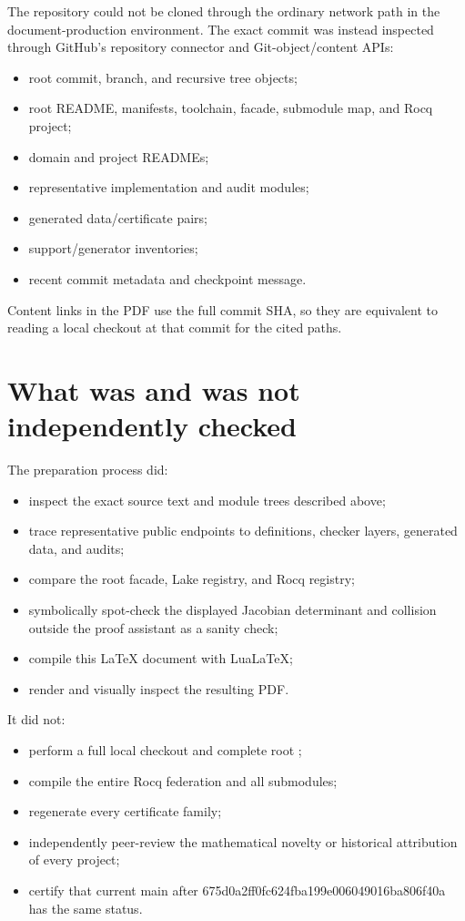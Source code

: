 \documentclass[
  10pt,
  a4paper,
  twoside,
  open=any,
  parskip=half,
  headings=big
]{scrreprt}
\newcommand{\CommitFull}{675d0a2ff0fc624fba199e006049016ba806f40a}
\newcommand{\code}[1]{\texttt{\detokenize{#1}}}
\begin{document}
The repository could not be cloned through the ordinary network path in the
document-production environment.  The exact commit was instead inspected
through GitHub's repository connector and Git-object/content APIs:

\begin{itemize}
  \item root commit, branch, and recursive tree objects;
  \item root README, manifests, toolchain, facade, submodule map, and Rocq
        project;
  \item domain and project READMEs;
  \item representative implementation and audit modules;
  \item generated data/certificate pairs;
  \item support/generator inventories;
  \item recent commit metadata and checkpoint message.
\end{itemize}

Content links in the PDF use the full commit SHA, so they are equivalent to
reading a local checkout at that commit for the cited paths.

\section{What was and was not independently checked}

The preparation process did:

\begin{itemize}
  \item inspect the exact source text and module trees described above;
  \item trace representative public endpoints to definitions, checker layers,
        generated data, and audits;
  \item compare the root facade, Lake registry, and Rocq registry;
  \item symbolically spot-check the displayed Jacobian determinant and
        collision outside the proof assistant as a sanity check;
  \item compile this \LaTeX{} document with Lua\LaTeX{};
  \item render and visually inspect the resulting PDF.
\end{itemize}

It did not:

\begin{itemize}
  \item perform a full local checkout and complete root \code{lake build};
  \item compile the entire Rocq federation and all submodules;
  \item regenerate every certificate family;
  \item independently peer-review the mathematical novelty or historical
        attribution of every project;
  \item certify that current main after \CommitFull{} has the same status.
\end{itemize}
\end{document}
